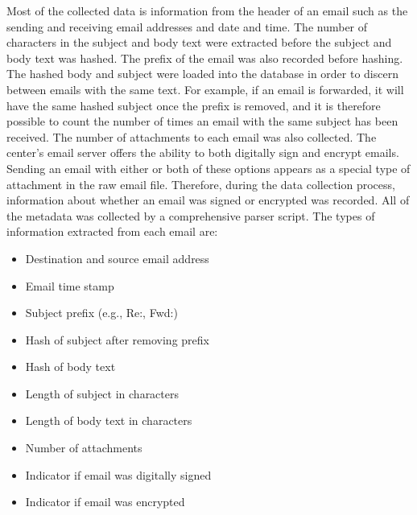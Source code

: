 \documentclass[12pt]{report}
\begin{document}
Most of the collected data is information from the header of an email such as the sending and receiving email addresses and date and time.
The number of characters in the subject and body text were extracted before the subject and body text was hashed.
The prefix of the email was also recorded before hashing.
The hashed body and subject were loaded into the database in order to discern between emails with the same text.
For example, if an email is forwarded, it will have the same hashed subject once the prefix is removed, and it is therefore possible to count the number of times an email with the same subject has been received.
The number of attachments to each email was also collected.
The center's email server offers the ability to both digitally sign and encrypt emails.
Sending an email with either or both of these options appears as a special type of attachment in the raw email file.
Therefore, during the data collection process, information about whether an email was signed or encrypted was recorded.  All of the metadata was collected by a comprehensive parser script.  The types of information extracted from each email are:
\begin{itemize}
	\setlength\itemsep{-0.75em}
	  
	\item Destination and source email address    
	\item Email time stamp                        
	\item Subject prefix (e.g., Re:, Fwd:)        
	\item Hash of subject after removing prefix   
	\item Hash of body text                       
	\item Length of subject in characters         
	\item Length of body text in characters       
	\item Number of attachments                   
	\item Indicator if email was digitally signed 
	\item Indicator if email was encrypted        

\end{itemize}
\end{document}
